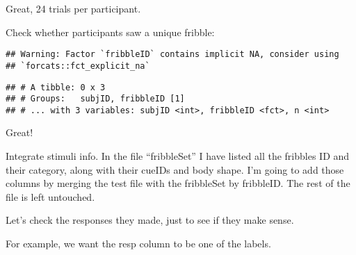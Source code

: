 \documentclass[
]{article}
\newenvironment{Shaded}{\begin{snugshade}}{\end{snugshade}}
\newcommand{\DataTypeTok}[1]{\textcolor[rgb]{0.13,0.29,0.53}{#1}}
\newcommand{\DecValTok}[1]{\textcolor[rgb]{0.00,0.00,0.81}{#1}}
\newcommand{\KeywordTok}[1]{\textcolor[rgb]{0.13,0.29,0.53}{\textbf{#1}}}
\newcommand{\NormalTok}[1]{#1}
\newcommand{\OperatorTok}[1]{\textcolor[rgb]{0.81,0.36,0.00}{\textbf{#1}}}
\newcommand{\OtherTok}[1]{\textcolor[rgb]{0.56,0.35,0.01}{#1}}
\newcommand{\StringTok}[1]{\textcolor[rgb]{0.31,0.60,0.02}{#1}}
\begin{document}
Great, 24 trials per participant.

Check whether participants saw a unique fribble:

\begin{Shaded}
\end{Shaded}

\begin{verbatim}
## Warning: Factor `fribbleID` contains implicit NA, consider using
## `forcats::fct_explicit_na`
\end{verbatim}

\begin{verbatim}
## # A tibble: 0 x 3
## # Groups:   subjID, fribbleID [1]
## # ... with 3 variables: subjID <int>, fribbleID <fct>, n <int>
\end{verbatim}

Great!

Integrate stimuli info. In the file ``fribbleSet'' I have listed all the
fribbles ID and their category, along with their cueIDs and body shape.
I'm going to add those columns by merging the test file with the
fribbleSet by fribbleID. The rest of the file is left untouched.

\begin{Shaded}
\end{Shaded}

Let's check the responses they made, just to see if they make sense.

For example, we want the resp column to be one of the labels.
\end{document}
